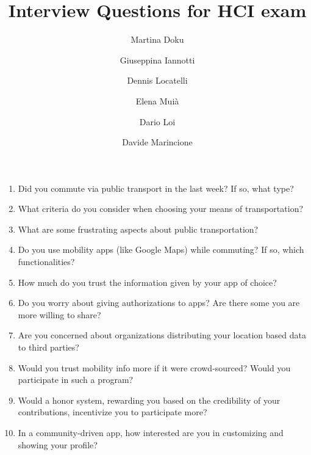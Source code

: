 \documentclass[a4paper, 12pt]{article}
\title{\Huge Interview Questions for HCI exam}
\author{Martina Doku \and Giuseppina Iannotti \and Dennis Locatelli \and Elena Muià \and Dario Loi \and Davide Marincione}
\begin{document}
    \maketitle
    \begin{enumerate}
        \item Did you commute via public transport in the last week? If so, what type?
        \item What criteria do you consider when choosing your means of transportation?
        \item What are some frustrating aspects about public transportation?
        \item Do you use mobility apps (like Google Maps) while commuting? If so, which functionalities?
        \item How much do you trust the information given by your app of choice?
        \item Do you worry about giving authorizations to apps? Are there some you are more willing to share?
        \item Are you concerned about organizations distributing your location based data to third parties?
        \item Would you trust mobility info more if it were crowd-sourced? Would you participate in such a program?
        \item Would a honor system, rewarding you based on the credibility of your contributions, incentivize you to participate more?
        \item In a community-driven app, how interested are you in customizing and showing your profile?
    \end{enumerate}
\end{document}
